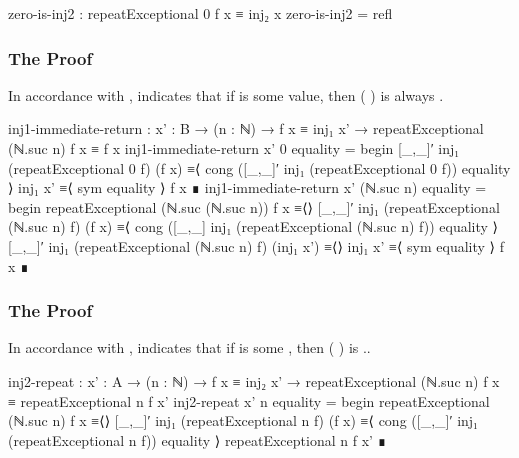\documentclass{report}
\begin{document}
\begin{code}
    zero-is-inj2 : repeatExceptional 0 f x ≡ inj₂ x
    zero-is-inj2 = refl
\end{code}

\subsubsection{The  Proof}
In accordance with ,  indicates that if   is some  value, then  \AgdaSymbol( \AgdaSymbol)   is always  .

\begin{code}
    inj1-immediate-return :
      {x' : B} →
      (n : ℕ) →
      f x ≡ inj₁ x' →
      repeatExceptional (ℕ.suc n) f x ≡ f x
    inj1-immediate-return {x'} 0 equality = begin
      [_,_]′ inj₁ (repeatExceptional 0 f) (f x)
        ≡⟨ cong ([_,_]′ inj₁ (repeatExceptional 0 f)) equality ⟩
      inj₁ x'
        ≡⟨ sym equality ⟩
      f x ∎
    inj1-immediate-return {x'} (ℕ.suc n) equality = begin
      repeatExceptional (ℕ.suc (ℕ.suc n)) f x
        ≡⟨⟩
      [_,_]′ inj₁ (repeatExceptional (ℕ.suc n) f) (f x)
        ≡⟨ cong ([_,_] inj₁ (repeatExceptional (ℕ.suc n) f)) equality ⟩
      [_,_]′ inj₁ (repeatExceptional (ℕ.suc n) f) (inj₁ x')
        ≡⟨⟩
      inj₁ x'
        ≡⟨ sym equality ⟩
      f x ∎
\end{code}

\subsubsection{The  Proof}
In accordance with ,  indicates that if   is some  , then  \AgdaSymbol( \AgdaSymbol)   is    ..

\begin{code}
    inj2-repeat :
      {x' : A} →
      (n : ℕ) →
      f x ≡ inj₂ x' →
      repeatExceptional (ℕ.suc n) f x ≡ repeatExceptional n f x'
    inj2-repeat {x'} n equality = begin
      repeatExceptional (ℕ.suc n) f x
        ≡⟨⟩
      [_,_]′ inj₁ (repeatExceptional n f) (f x)
        ≡⟨ cong ([_,_]′ inj₁ (repeatExceptional n f)) equality ⟩
      repeatExceptional n f x' ∎
\end{code}
\end{document}
